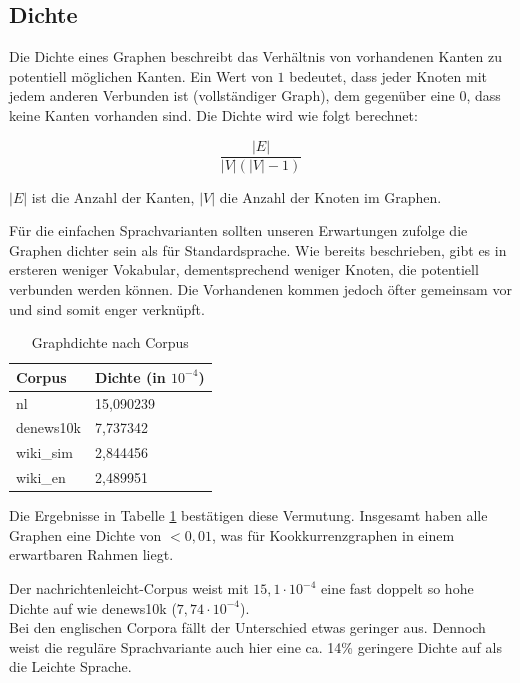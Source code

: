 \documentclass[11pt, a4paper]{article}
\begin{document}
\subsection{Dichte}

Die Dichte eines Graphen beschreibt das Verhältnis von vorhandenen Kanten zu
potentiell möglichen Kanten.
Ein Wert von $1$ bedeutet, dass jeder Knoten mit jedem anderen Verbunden ist
(vollständiger Graph), dem gegenüber eine $0$, dass keine Kanten vorhanden sind.
Die Dichte wird wie folgt berechnet:

$$
    \frac{|E|}{|V|\left(|V|-1\right)}
$$

$|E|$ ist die Anzahl der Kanten, $|V|$ die Anzahl der Knoten im Graphen. 


Für die einfachen Sprachvarianten sollten unseren Erwartungen zufolge die
Graphen dichter sein als für Standardsprache.
Wie bereits beschrieben, gibt es in ersteren weniger Vokabular, dementsprechend
weniger Knoten, die potentiell verbunden werden können. Die Vorhandenen kommen
jedoch öfter gemeinsam vor und sind somit enger verknüpft.

\begin{table}[ht]
  \centering
  \begin{tabular}{ll}
    \toprule
    Corpus            &         Dichte (in $10^{-4}$)\\
    \midrule
    nl                &  		15,090239 \\
    denews10k         &  		7,737342 \\
    wiki\_sim         &  		2,844456 \\
    wiki\_en          &  		2,489951 \\
    \bottomrule
  \end{tabular}
  \caption{\label{density_table} Graphdichte nach Corpus}
\end{table}

Die Ergebnisse in Tabelle \ref{density_table} bestätigen diese Vermutung.
Insgesamt haben alle Graphen eine Dichte von $<0,01$, was für
Kookkurrenzgraphen in einem erwartbaren Rahmen liegt.

Der nachrichtenleicht-Corpus weist mit $15,1\cdot 10^{-4}$ eine fast doppelt so
hohe Dichte auf wie denews10k ($7,74\cdot 10^{-4}$).\\
Bei den englischen Corpora fällt der Unterschied etwas geringer aus.
Dennoch weist die reguläre Sprachvariante auch hier eine ca. 14\% geringere
Dichte auf als die Leichte Sprache.
\end{document}
